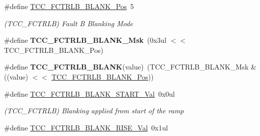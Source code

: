 \begin{DoxyCompactItemize}
\item 
\hypertarget{group___s_a_m_l21___t_c_c_ga43f50b938e3b7d7d9e7829e9550b855c}{}\#define \hyperlink{group___s_a_m_l21___t_c_c_ga43f50b938e3b7d7d9e7829e9550b855c}{T\+C\+C\+\_\+\+F\+C\+T\+R\+L\+B\+\_\+\+B\+L\+A\+N\+K\+\_\+\+Pos}~5\label{group___s_a_m_l21___t_c_c_ga43f50b938e3b7d7d9e7829e9550b855c}

\begin{DoxyCompactList}\small\item\em (T\+C\+C\+\_\+\+F\+C\+T\+R\+L\+B) Fault B Blanking Mode \end{DoxyCompactList}\item 
\hypertarget{group___s_a_m_l21___t_c_c_gae92eab398192ebd609d162db46ae3b88}{}\#define {\bfseries T\+C\+C\+\_\+\+F\+C\+T\+R\+L\+B\+\_\+\+B\+L\+A\+N\+K\+\_\+\+Msk}~(0x3ul $<$$<$ T\+C\+C\+\_\+\+F\+C\+T\+R\+L\+B\+\_\+\+B\+L\+A\+N\+K\+\_\+\+Pos)\label{group___s_a_m_l21___t_c_c_gae92eab398192ebd609d162db46ae3b88}

\item 
\hypertarget{group___s_a_m_l21___t_c_c_ga16e85f0bb6f4c4c1233b0da6d7d72175}{}\#define {\bfseries T\+C\+C\+\_\+\+F\+C\+T\+R\+L\+B\+\_\+\+B\+L\+A\+N\+K}(value)~(T\+C\+C\+\_\+\+F\+C\+T\+R\+L\+B\+\_\+\+B\+L\+A\+N\+K\+\_\+\+Msk \& ((value) $<$$<$ \hyperlink{group___s_a_m_l21___t_c_c_ga43f50b938e3b7d7d9e7829e9550b855c}{T\+C\+C\+\_\+\+F\+C\+T\+R\+L\+B\+\_\+\+B\+L\+A\+N\+K\+\_\+\+Pos}))\label{group___s_a_m_l21___t_c_c_ga16e85f0bb6f4c4c1233b0da6d7d72175}

\item 
\hypertarget{group___s_a_m_l21___t_c_c_gad12042c8eb3b6cd0794646e7650711cd}{}\#define \hyperlink{group___s_a_m_l21___t_c_c_gad12042c8eb3b6cd0794646e7650711cd}{T\+C\+C\+\_\+\+F\+C\+T\+R\+L\+B\+\_\+\+B\+L\+A\+N\+K\+\_\+\+S\+T\+A\+R\+T\+\_\+\+Val}~0x0ul\label{group___s_a_m_l21___t_c_c_gad12042c8eb3b6cd0794646e7650711cd}

\begin{DoxyCompactList}\small\item\em (T\+C\+C\+\_\+\+F\+C\+T\+R\+L\+B) Blanking applied from start of the ramp \end{DoxyCompactList}\item 
\hypertarget{group___s_a_m_l21___t_c_c_ga17f2009211f31ab83b9b88230b89d939}{}\#define \hyperlink{group___s_a_m_l21___t_c_c_ga17f2009211f31ab83b9b88230b89d939}{T\+C\+C\+\_\+\+F\+C\+T\+R\+L\+B\+\_\+\+B\+L\+A\+N\+K\+\_\+\+R\+I\+S\+E\+\_\+\+Val}~0x1ul\label{group___s_a_m_l21___t_c_c_ga17f2009211f31ab83b9b88230b89d939}


\end{DoxyCompactItemize}
